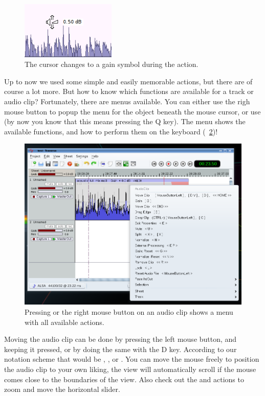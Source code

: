 \begin{figure}
 \centering\includegraphics[width=0.4\textwidth]{../images/gain-cursor.png}
 \caption{The cursor changes to a gain symbol during the  action.}
 \label{fig_gaincursor}
\end{figure}

Up to now we used some simple and easily memorable actions, but there are of course a lot more. But how to know which functions are available for a track or audio clip? Fortunately, there are menus available. You can either use the righ mouse button to popup the menu for the object beneath the mouse cursor, or use  (by now you know that this means pressing the Q key). The menu shows the available functions, and how to perform them on the keyboard (\FigB\ \ref{fig_clipmenu})!

\begin{figure}
 \centering\includegraphics[width=\textwidth]{../images/clipmenu.png}
 \caption{Pressing  or the right mouse button on an audio clip shows a menu with all available actions.}
 \label{fig_clipmenu}
\end{figure}

Moving the audio clip can be done by pressing the left mouse button, and keeping it pressed, or by doing the same with the D key. According to our notation scheme that would be , , or . You can move the mouse freely to position the audio clip to your own liking, the view will automatically scroll if the mouse comes close to the boundaries of the view. Also check out the  and  actions to zoom and move the horizontal slider.

